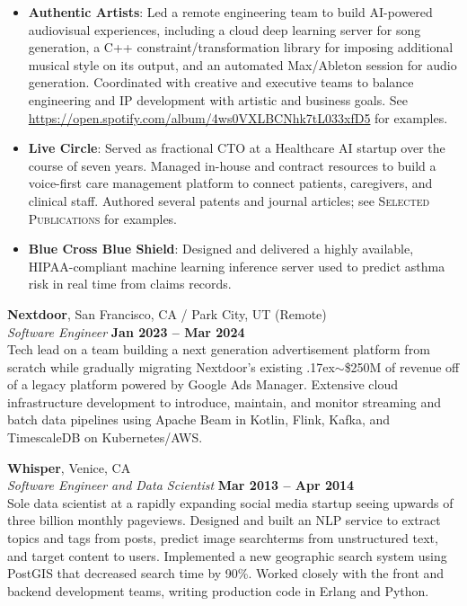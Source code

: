 \documentclass[margin,line]{resume}
\begin{document}
\begin{resume}
\begin{itemize}
    \item \textbf{Authentic Artists}: Led a remote engineering team to build AI-powered audiovisual
      experiences, including a cloud deep learning server for song generation, a
      C++ constraint/transformation library for imposing additional musical style
      on its output, and an automated Max/Ableton session for audio generation.
      Coordinated with creative and executive teams to balance engineering and IP
      development with artistic and business goals. See
      \url{https://open.spotify.com/album/4ws0VXLBCNhk7tL033xfD5} for examples.

    \item \textbf{Live Circle}: Served as fractional CTO at a Healthcare AI
      startup over the course of seven years. Managed in-house and contract
      resources to build a voice-first care management platform to connect
      patients, caregivers, and clinical staff. Authored several patents and
      journal articles; see \textsc{Selected Publications} for examples.

    \item \textbf{Blue Cross Blue Shield}: Designed and delivered a highly
      available, HIPAA-compliant machine learning inference server used to
      predict asthma risk in real time from claims records.

    \end{itemize}



    \textbf{Nextdoor}, San Francisco, CA / Park City, UT (Remote)  \vspace{2mm}\\\vspace{1mm}%
    \textsl{Software Engineer} \hfill \textbf{Jan 2023 -- Mar 2024}\\
    Tech lead on a team building a next generation advertisement platform from
    scratch while gradually migrating Nextdoor's existing
    {\raise.17ex\hbox{$\scriptstyle\sim$}}\$250M of revenue off of a legacy
    platform powered by Google Ads Manager. Extensive cloud infrastructure
    development to introduce, maintain, and monitor streaming and batch data
    pipelines using Apache Beam in Kotlin, Flink, Kafka, and TimescaleDB on
    Kubernetes/AWS.

    \textbf{Whisper}, Venice, CA \vspace{2mm}\\\vspace{1mm}%
    \textsl{Software Engineer and Data Scientist} \hfill \textbf{Mar 2013 -- Apr 2014}\\
    Sole data scientist at a rapidly expanding social media startup
    seeing upwards of three billion monthly pageviews. Designed and built an NLP
    service to extract topics and tags from posts, predict image searchterms
    from unstructured text, and target content to users. Implemented a new
    geographic search system using PostGIS that decreased search time by
    90\%. Worked closely with the front and backend development teams, writing
    production code in Erlang and Python.


\end{resume}
\end{document}

